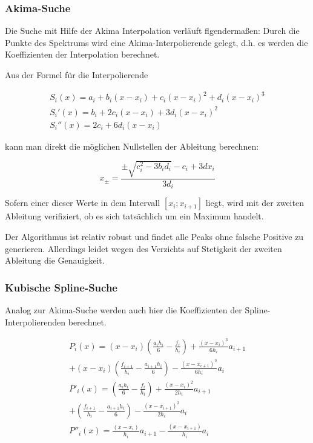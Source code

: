 \documentclass[10pt,a4paper,german]{scrartcl}
\begin{document}
    	\subsubsection*{Akima-Suche}
    	  Die Suche mit Hilfe der Akima Interpolation verläuft flgendermaßen:
    	  Durch die Punkte des Spektrums wird eine Akima-Interpolierende gelegt,
    	  d.h. es werden die Koeffizienten der Interpolation berechnet.
    	  
    	  Aus der Formel für die Interpolierende
    	  
    	  \begin{multline*}
    	    S_i(x) = a_i + b_i(x-x_i)+c_i(x-x_i)^2+d_i(x-x_i)^3 \\
     	    S_i'(x) = b_i+2 c_i(x-x_i)+3 d_i(x-x_i)^2 \\
     	    S_i''(x) = 2 c_i+6 d_i(x-x_i)
    	  \end{multline*}
    	  
    	  kann man direkt die möglichen Nullstellen der Ableitung berechnen:
    	  
        \begin{equation}
          x_{\pm} = \frac{\pm\sqrt{c_i^2-3 b_i d_i}-c_i+3 d x_i }{3 d_i}
        \end{equation}

        Sofern einer dieser Werte in dem Intervall $[x_i;x_{i+1}]$ liegt,
        wird mit der zweiten Ableitung verifiziert, ob es sich tatsächlich
        um ein Maximum handelt.
        
        Der Algorithmus ist relativ robust und findet alle Peaks ohne
        falsche Positive zu generieren. Allerdings leidet wegen des Verzichts 
        auf Stetigkeit der zweiten Ableitung die Genauigkeit.
      
    	\subsubsection*{Kubische Spline-Suche}
    	  Analog zur Akima-Suche werden auch hier die Koeffizienten der
    	  Spline-Interpolierenden berechnet.
    	  
    	  \begin{multline*}
          P_i(x)=
            (x-x_i) \left(\frac{a_i h_i}{6} -\frac{f_i}{h_i}\right)
            +\frac{(x-x_i)^3}{6 h_i}a_{i+1}
            \\
            +(x-x_i ) \left(\frac{f_{i+1}}{h_i}-\frac{a_{i+1} h_i}{6}\right)
            -\frac{(x-x_{i+1})^3}{6 h_i}a_i \\
          P'_i(x)=
            \left(\frac{a_i h_i}{6} -\frac{f_i}{h_i}\right)
            +\frac{(x-x_i)^2}{2 h_i}a_{i+1}
            \\
            +\left(\frac{f_{i+1}}{h_i}-\frac{a_{i+1} h_i}{6}\right)
            -\frac{(x-x_{i+1})^2}{2 h_i}a_i \\
          P''_i(x)=
            \frac{(x-x_i)}{h_i}a_{i+1}
            -\frac{(x-x_{i+1})}{h_i}a_i \\
    	  \end{multline*}
    	  
\end{document}
